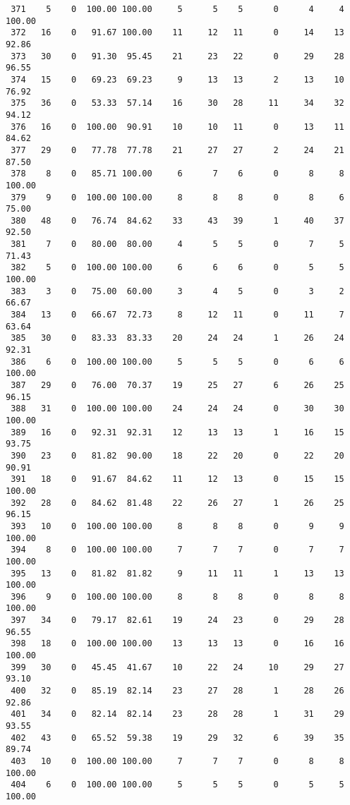\begin{verbatim}
 371    5    0  100.00 100.00     5      5    5      0      4     4   100.00
 372   16    0   91.67 100.00    11     12   11      0     14    13    92.86
 373   30    0   91.30  95.45    21     23   22      0     29    28    96.55
 374   15    0   69.23  69.23     9     13   13      2     13    10    76.92
 375   36    0   53.33  57.14    16     30   28     11     34    32    94.12
 376   16    0  100.00  90.91    10     10   11      0     13    11    84.62
 377   29    0   77.78  77.78    21     27   27      2     24    21    87.50
 378    8    0   85.71 100.00     6      7    6      0      8     8   100.00
 379    9    0  100.00 100.00     8      8    8      0      8     6    75.00
 380   48    0   76.74  84.62    33     43   39      1     40    37    92.50
 381    7    0   80.00  80.00     4      5    5      0      7     5    71.43
 382    5    0  100.00 100.00     6      6    6      0      5     5   100.00
 383    3    0   75.00  60.00     3      4    5      0      3     2    66.67
 384   13    0   66.67  72.73     8     12   11      0     11     7    63.64
 385   30    0   83.33  83.33    20     24   24      1     26    24    92.31
 386    6    0  100.00 100.00     5      5    5      0      6     6   100.00
 387   29    0   76.00  70.37    19     25   27      6     26    25    96.15
 388   31    0  100.00 100.00    24     24   24      0     30    30   100.00
 389   16    0   92.31  92.31    12     13   13      1     16    15    93.75
 390   23    0   81.82  90.00    18     22   20      0     22    20    90.91
 391   18    0   91.67  84.62    11     12   13      0     15    15   100.00
 392   28    0   84.62  81.48    22     26   27      1     26    25    96.15
 393   10    0  100.00 100.00     8      8    8      0      9     9   100.00
 394    8    0  100.00 100.00     7      7    7      0      7     7   100.00
 395   13    0   81.82  81.82     9     11   11      1     13    13   100.00
 396    9    0  100.00 100.00     8      8    8      0      8     8   100.00
 397   34    0   79.17  82.61    19     24   23      0     29    28    96.55
 398   18    0  100.00 100.00    13     13   13      0     16    16   100.00
 399   30    0   45.45  41.67    10     22   24     10     29    27    93.10
 400   32    0   85.19  82.14    23     27   28      1     28    26    92.86
 401   34    0   82.14  82.14    23     28   28      1     31    29    93.55
 402   43    0   65.52  59.38    19     29   32      6     39    35    89.74
 403   10    0  100.00 100.00     7      7    7      0      8     8   100.00
 404    6    0  100.00 100.00     5      5    5      0      5     5   100.00

\end{verbatim}
